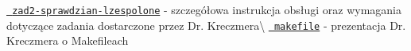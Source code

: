\href{./zad2-sprawdzian-lzespolone.pdf}{\texttt{ zad2-\/sprawdzian-\/lzespolone}} -\/ szczegółowa instrukcja obsługi oraz wymagania dotyczące zadania dostarczone przez Dr. Kreczmera\textbackslash{} \href{./makefile.pdf}{\texttt{ makefile}} -\/ prezentacja Dr. Kreczmera o Makefile\textquotesingle{}ach 